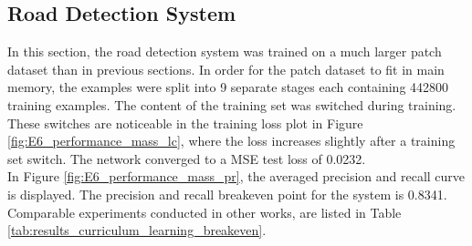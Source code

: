 \subsection{Road Detection System}
\label{sec:results_road_detection_system}
In this section, the road detection system was trained on a much larger patch dataset than in previous sections. In order for the patch dataset to fit in main memory, the examples were split into 9 separate stages each containing 442800 training examples. The content of the training set was switched during training. These switches are noticeable in the training loss plot in Figure \ref{fig:E6_performance_mass_lc}, where the loss increases slightly after a training set switch. The network converged to a \ac{MSE} test loss of 0.0232. \\

In Figure \ref{fig:E6_performance_mass_pr}, the averaged precision and recall curve is displayed. The precision and recall breakeven point for the system is 0.8341. Comparable experiments conducted in other works, are listed in Table \ref{tab:results_curriculum_learning_breakeven}.\\

